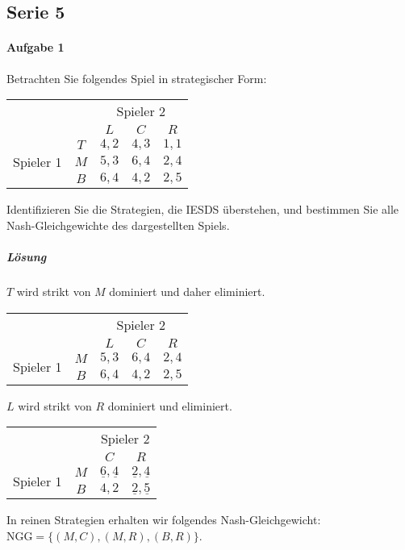 \subsection{Serie 5}%
\label{sub:serie_5}

\paragraph{Aufgabe 1}%
\label{par:serie_5_aufgabe_1}

Betrachten Sie folgendes Spiel in strategischer Form:
\begin{center}
  \begin{tabular}{ccccc}
    & & \multicolumn{3}{c}{Spieler 2}\\
    & & $L$ & $C$ & $R$\\
    \cmidrule{3-5}
    \multirow{3}{*}{Spieler 1}
    & $T$ & $4,2$ & $4,3$ & $1,1$\\
    \cmidrule{3-5}
    & $M$ & $5,3$ & $6,4$ & $2,4$\\
    \cmidrule{3-5}
    & $B$ & $6,4$ & $4,2$ & $2,5$\\
    \cmidrule{3-5}
  \end{tabular}
\end{center}

Identifizieren Sie die Strategien, die IESDS überstehen, und bestimmen Sie alle
Nash-Gleichgewichte des dargestellten Spiels.

\subparagraph{Lösung}%

$T$ wird strikt von $M$ dominiert und daher eliminiert.
\begin{center}
  \begin{tabular}{ccccc}
    & & \multicolumn{3}{c}{Spieler 2}\\
    & & $L$ & $C$ & $R$\\
    \cmidrule{3-5}
    \multirow{2}{*}{Spieler 1}
    & $M$ & $5,3$ & $6,4$ & $2,4$\\
    \cmidrule{3-5}
    & $B$ & $6,4$ & $4,2$ & $2,5$\\
    \cmidrule{3-5}
  \end{tabular}
\end{center}
$L$ wird strikt von $R$ dominiert und eliminiert.
\begin{center}
  \begin{tabular}{cccc}
    & & \multicolumn{2}{c}{Spieler 2}\\
    & & $C$ & $R$\\
    \cmidrule{3-4}
    \multirow{2}{*}{Spieler 1}
    & $M$ & $\underline{6},\underline{4}$ & $\underline{2},\underline{4}$\\
    \cmidrule{3-4}
    & $B$ & $4,2$ & $\underline{2},\underline{5}$\\
    \cmidrule{3-4}
  \end{tabular}
\end{center}
In reinen Strategien erhalten wir folgendes Nash-Gleichgewicht:
$\text{NGG} = \{(M,C), (M,R), (B,R)\}$.

